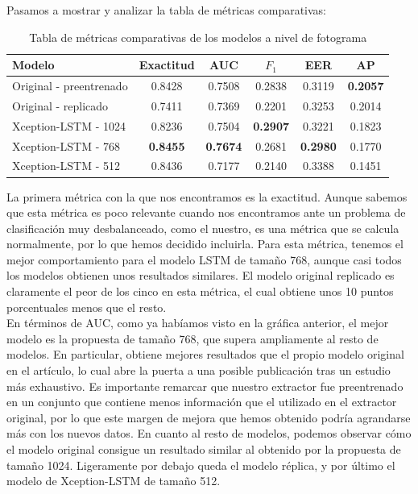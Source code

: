 \documentclass[../main.tex]{memoir}
\begin{document}
Pasamos a mostrar y analizar la tabla de métricas comparativas:

\begin{table}[H]
  \centering
  \begin{tabular}{lccccc}
    \toprule
    Modelo & Exactitud & AUC & $F_1$ & EER & AP \\
    \midrule
    Original - preentrenado & 0.8428 & 0.7508 & 0.2838 & 0.3119 & \textbf{0.2057} \\
    Original - replicado & 0.7411 & 0.7369 & 0.2201 & 0.3253 & 0.2014 \\
    Xception-LSTM - 1024 & 0.8236 & 0.7504 & \textbf{0.2907} & 0.3221 & 0.1823 \\
    Xception-LSTM - 768 & \textbf{0.8455} & \textbf{0.7674} & 0.2681 & \textbf{0.2980} & 0.1770 \\
    Xception-LSTM - 512 & 0.8436 & 0.7177 & 0.2140 & 0.3388 & 0.1451 \\
    \bottomrule
  \end{tabular}
  \caption{Tabla de métricas comparativas de los modelos a nivel de fotograma}
  \label{tab:confusion-matrices}
\end{table}

La primera métrica con la que nos encontramos es la exactitud. Aunque
sabemos que esta métrica es poco relevante cuando nos encontramos ante
un problema de clasificación muy desbalanceado, como el nuestro, es
una métrica que se calcula normalmente, por lo que hemos decidido
incluirla. Para esta métrica, tenemos el mejor comportamiento para el
modelo LSTM de tamaño 768, aunque casi todos los modelos obtienen unos
resultados similares. El modelo original replicado es claramente el
peor de los cinco en esta métrica, el cual obtiene unos 10 puntos
porcentuales menos que el resto.\\

En términos de AUC, como ya habíamos visto en la gráfica anterior, el
mejor modelo es la propuesta de tamaño 768, que supera ampliamente al
resto de modelos. En particular, obtiene mejores resultados que el
propio modelo original en el artículo, lo cual abre la puerta a una
posible publicación tras un estudio más exhaustivo. Es importante
remarcar que nuestro extractor fue preentrenado en un conjunto que
contiene menos información que el utilizado en el extractor original,
por lo que este margen de mejora que hemos obtenido podría agrandarse
más con los nuevos datos. En cuanto al resto de modelos, podemos
observar cómo el modelo original consigue un resultado similar al
obtenido por la propuesta de tamaño 1024. Ligeramente por debajo queda
el modelo réplica, y por último el modelo de Xception-LSTM de tamaño 512.\\
\end{document}
